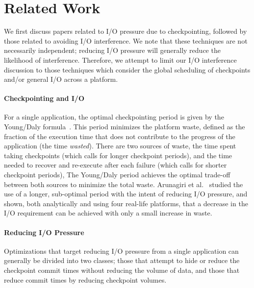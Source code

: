 

\section{Related Work}\label{sec:related}

We first discuss papers related to I/O
pressure due to checkpointing, followed by those related to avoiding I/O
interference.  We note that these techniques are not necessarily independent;
reducing I/O pressure will generally reduce the likelihood of interference.
Therefore, we attempt to limit our I/O interference discussion to those
techniques which consider the global scheduling of checkpoints and/or general
I/O across a platform.


\paragraph*{Checkpointing and I/O}

For a single application, the optimal checkpointing period is given by the
Young/Daly formula~\cite{young74,daly04}. This period minimizes the platform
waste, defined as the fraction of the execution time that does not contribute
to the progress of the application (the time \emph{wasted}).  There are two
sources of waste, the time spent taking checkpoints (which calls for longer
checkpoint periods), and the time needed to recover and re-execute after each
failure (which calls for shorter checkpoint periods), The Young/Daly period
achieves the optimal trade-off between both sources to minimize the total
waste. Arunagiri et al.~\cite{Arunagiri2010} studied the use of a longer,
sub-optimal period with the intent of reducing I/O pressure, and shown,
both analytically and using four real-life platforms, that a decrease in the
I/O requirement can be achieved with only a small increase in waste.

\paragraph*{Reducing I/O Pressure}

Optimizations that target reducing I/O pressure from a single application can
generally be divided into two classes; those that attempt to hide or reduce the
checkpoint commit times without reducing the volume of data, and those that
reduce commit times by reducing checkpoint volumes.

